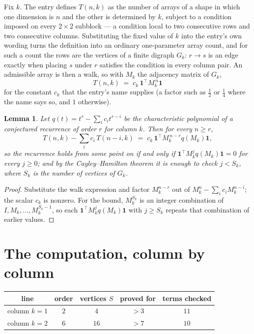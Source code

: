 \documentclass[11pt,a4paper]{article}
\theoremstyle{plain}
\newtheorem{lemma}[theorem]{Lemma}
\theoremstyle{definition}
\begin{document}
Fix $k$. The entry defines $T(n,k)$ as the number of arrays of a shape in which one dimension
is $n$ and the other is determined by $k$, subject to a condition imposed on every
$2\times2$ subblock --- a condition local to two consecutive rows and two consecutive columns.
Substituting the fixed value of $k$ into the entry's own wording turns the definition into an
ordinary one-parameter array count, and for such a count the rows are the vertices of a finite
digraph $G_k$: $r\to s$ is an edge exactly when placing $s$ under $r$ satisfies the condition
in every column pair. An admissible array is then a walk, so with $M_k$ the adjacency matrix
of $G_k$,
\[
T(n,k)\;=\;c_k\,\mathbf{1}^{\!\top}M_k^{\,n}\mathbf{1}
\]
for the constant $c_k$ that the entry's name supplies (a factor such as $\tfrac12$ or
$\tfrac14$ where the name says so, and $1$ otherwise).

\begin{lemma}\label{lem:crit}
Let $q(t)=t^{r}-\sum_i c_it^{r-i}$ be the characteristic polynomial of a conjectured
recurrence of order $r$ for column $k$. Then for every $n\ge r$,
\[
T(n,k)-\sum_i c_i\,T(n-i,k)\;=\;c_k\,\mathbf{1}^{\!\top}M_k^{\,n-r}q(M_k)\mathbf{1},
\]
so the recurrence holds from some point on if and only if
$\mathbf{1}^{\!\top}M_k^{j}q(M_k)\mathbf{1}=0$ for every $j\ge0$; and by the
Cayley--Hamilton theorem it is enough to check $j<S_k$, where $S_k$ is the number of vertices
of $G_k$.
\end{lemma}

\begin{proof}
Substitute the walk expression and factor $M_k^{n-r}$ out of $M_k^{n}-\sum_ic_iM_k^{n-i}$;
the scalar $c_k$ is nonzero. For the bound, $M_k^{S_k}$ is an integer combination of
$I,M_k,\dots,M_k^{S_k-1}$, so each $\mathbf{1}^{\!\top}M_k^{j}q(M_k)\mathbf{1}$ with
$j\ge S_k$ repeats that combination of earlier values.
\end{proof}

\section{The computation, column by column}

\begin{center}
\begin{tabular}{ccccc}
line & order & vertices $S$ & proved for & terms checked \\ \hline
column $k$$=1$ & $2$ & $4$ & $>3$ & $11$ \\
column $k$$=2$ & $6$ & $16$ & $>7$ & $10$ \\
\end{tabular}
\end{center}
\end{document}
